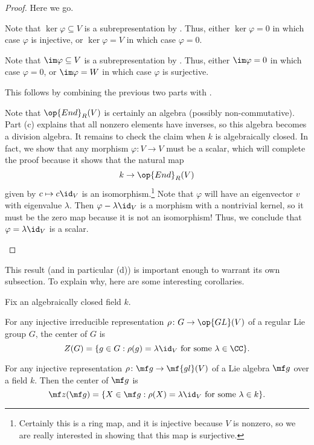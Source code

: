\documentclass[../notes.tex]{subfiles}
\begin{document}
\begin{proof}
	Here we go.
	\begin{listalph}
		\item Note that $\ker\varphi\subseteq V$ is a subrepresentation by . Thus, either $\ker\varphi=0$ in which case $\varphi$ is injective, or $\ker\varphi=V$ in which case $\varphi=0$.
		\item Note that $\im\varphi\subseteq V$ is a subrepresentation by . Thus, either $\im\varphi=0$ in which case $\varphi=0$, or $\im\varphi=W$ in which case $\varphi$ is surjective.
		\item This follows by combining the previous two parts with .
		\item Note that $\op{End}_R(V)$ is certainly an algebra (possibly non-commutative). Part (c) explains that all non\-zero elements have inverses, so this algebra becomes a division algebra. It remains to check the claim when $k$ is algebraically closed. In fact, we show that any morphism $\varphi\colon V\to V$ must be a scalar, which will complete the proof because it shows that the natural map
		\[k\to\op{End}_R(V)\]
		given by $c\mapsto c\id_V$ is an isomorphism.\footnote{Certainly this is a ring map, and it is injective because $V$ is nonzero, so we are really interested in showing that this map is surjective.} Note that $\varphi$ will have an eigenvector $v$ with eigenvalue $\lambda$. Then $\varphi-\lambda\id_V$ is a morphism with a nontrivial kernel, so it must be the zero map because it is not an isomorphism! Thus, we conclude that $\varphi=\lambda\id_V$ is a scalar.
		\qedhere
	\end{listalph}
\end{proof}
This result (and in particular (d)) is important enough to warrant its own subsection. To explain why, here are some interesting corollaries.
\begin{corollary} \label{cor:center-of-lie}
	Fix an algebraically closed field $k$.
	\begin{listalph}
		\item For any injective irreducible representation $\rho\colon G\to\op{GL}(V)$ of a regular Lie group $G$, the center of $G$ is
		\[Z(G)=\{g\in G:\rho(g)=\lambda{\id_V}\text{ for some }\lambda\in\CC\}.\]
		\item For any injective representation $\rho\colon\mf g\to\mf{gl}(V)$ of a Lie algebra $\mf g$ over a field $k$. Then the center of $\mf g$ is
		\[\mf z(\mf g)=\{X\in\mf g:\rho(X)=\lambda{\id_V}\text{ for some }\lambda\in k\}.\]
	\end{listalph}
\end{corollary}
\end{document}

